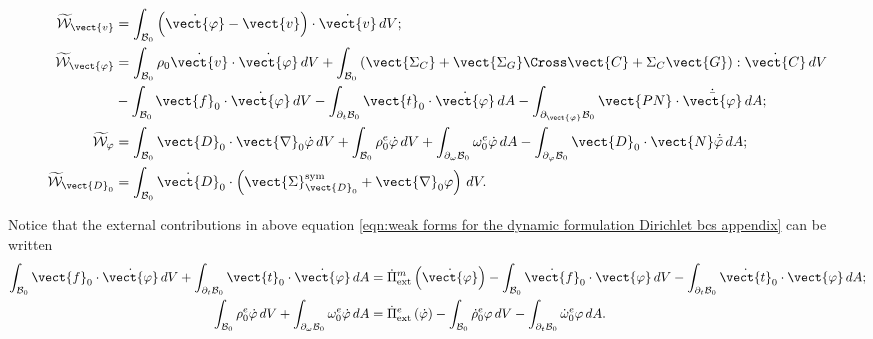 \begin{equation}\label{eqn:weak forms for the dynamic formulation Dirichlet bcs appendix}
\begin{aligned}
\widetilde{\mathcal{W}}_{\vect{v}} & = \int_{\mathcal{B}_0}\left(\dot{\vect{\varphi}} - \vect{v}\right)\cdot\dot{\vect{v}}\,dV;\\
%
\widetilde{\mathcal{W}}_{\vect{\varphi}} & =  \int_{\mathcal{B}_0}\rho_0\dot{\vect{v}}\cdot\dot{\vect{\varphi}}\,dV + \int_{\mathcal{B}_0}\left(\vect{\Sigma_C} + \vect{\Sigma_G}\Cross\vect{C} + \Sigma_C\vect{G}\right):\dot{\vect{C}}\,dV\\&-  \int_{\mathcal{B}_0}\vect{f}_0\cdot\dot{\vect{\varphi}}\,dV-
\int_{\partial_{t}\mathcal{B}_0}\vect{t}_0\cdot\dot{\vect{\varphi}}\,dA - \int_{\partial_{\vect{\varphi}}\mathcal{B}_0}\vect{PN}\cdot\dot{\bar{\vect{\varphi}}}\,dA;\\
%
\widetilde{\mathcal{W}}_{\varphi} & =  \int_{\mathcal{B}_0}\vect{D}_0\cdot\vect{\nabla}_0\dot{\varphi}\,dV+  \int_{\mathcal{B}_0}\rho_0^e\dot{\varphi}\,dV+
\int_{\partial_{\omega}\mathcal{B}_0}\omega^e_0\dot{\varphi}\,dA - \int_{\partial_{\varphi}\mathcal{B}_0}\vect{D}_0\cdot\vect{N}\dot{\bar{\varphi}}\,dA;\\
%
\widetilde{\mathcal{W}}_{\vect{D}_0} & =   \int_{\mathcal{B}_0}\dot{\vect{D}}_0\cdot \left(\vect{\Sigma}^{\text{sym}}_{\vect{D}_0} + \vect{\nabla}_0\varphi\right)\,dV.
%
\end{aligned}
\end{equation}


Notice that the external contributions in above equation \eqref{eqn:weak forms for the dynamic formulation Dirichlet bcs appendix} can be written
%
\begin{equation}\label{eqn:DPiextr appendix}
\begin{aligned}
\int_{\mathcal{B}_0}\vect{f}_0\cdot\dot{\vect{\varphi}}\,dV + 
\int_{\partial_t\mathcal{B}_0}\vect{t}_0\cdot\dot{\vect{\varphi}}\,dA & = \dot{\Pi}^m_{\text{ext}}\left(\dot{\vect{\varphi}}\right) - \int_{\mathcal{B}_0}\dot{\vect{f}}_0\cdot\vect{\varphi}\,dV- \int_{\partial_t\mathcal{B}_0}\dot{\vect{t}}_0\cdot\vect{\varphi}\,dA;\\
%
\int_{\mathcal{B}_0}{\rho}^e_0\dot{{\varphi}}\,dV + 
\int_{\partial_{\omega}\mathcal{B}_0}\omega^e_0\dot{\varphi}\,dA & = \dot{\Pi}^e_{\text{ext}}\left(\dot{{\varphi}}\right) - \int_{\mathcal{B}_0}\dot{\rho}_0^e{\varphi}\,dV- \int_{\partial_t\mathcal{B}_0}\dot{\omega}^e_0{\varphi}\,dA.
%
%
\end{aligned}
\end{equation}

